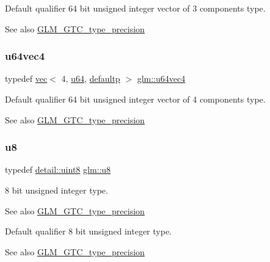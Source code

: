 Default qualifier 64 bit unsigned integer vector of 3 components type. \begin{DoxySeeAlso}{See also}
\hyperlink{group__gtc__type__precision}{G\+L\+M\+\_\+\+G\+T\+C\+\_\+type\+\_\+precision} 
\end{DoxySeeAlso}
\mbox{\label{group__gtc__type__precision_ga70396c4f422824503c870db50b3059fd}} 
\subsubsection{\texorpdfstring{u64vec4}{u64vec4}}
{\footnotesize\ttfamily typedef \hyperlink{structglm_1_1vec}{vec}$<$ 4, \hyperlink{group__gtc__type__precision_ga71cedd4972f9cb1a5e14dfe5ab83ecd7}{u64}, \hyperlink{namespaceglm_a36ed105b07c7746804d7fdc7cc90ff25a9d21ccd8b5a009ec7eb7677befc3bf51}{defaultp} $>$ \hyperlink{group__gtc__type__precision_ga70396c4f422824503c870db50b3059fd}{glm\+::u64vec4}}

Default qualifier 64 bit unsigned integer vector of 4 components type. \begin{DoxySeeAlso}{See also}
\hyperlink{group__gtc__type__precision}{G\+L\+M\+\_\+\+G\+T\+C\+\_\+type\+\_\+precision} 
\end{DoxySeeAlso}
\mbox{\label{group__gtc__type__precision_ga5e3dc67373d5068997d2d9f41c9024d2}} 
\subsubsection{\texorpdfstring{u8}{u8}}
{\footnotesize\ttfamily typedef \hyperlink{namespaceglm_1_1detail_aef2588f97d090cc19fbbe0c74fe17c8f}{detail\+::uint8} \hyperlink{group__gtc__type__precision_ga5e3dc67373d5068997d2d9f41c9024d2}{glm\+::u8}}

8 bit unsigned integer type. \begin{DoxySeeAlso}{See also}
\hyperlink{group__gtc__type__precision}{G\+L\+M\+\_\+\+G\+T\+C\+\_\+type\+\_\+precision}
\end{DoxySeeAlso}
Default qualifier 8 bit unsigned integer type. \begin{DoxySeeAlso}{See also}
\hyperlink{group__gtc__type__precision}{G\+L\+M\+\_\+\+G\+T\+C\+\_\+type\+\_\+precision} 
\end{DoxySeeAlso}
\mbox{\label{group__gtc__type__precision_ga5b0875b5979b80a0ccb371bf7f0f95d8}} 
